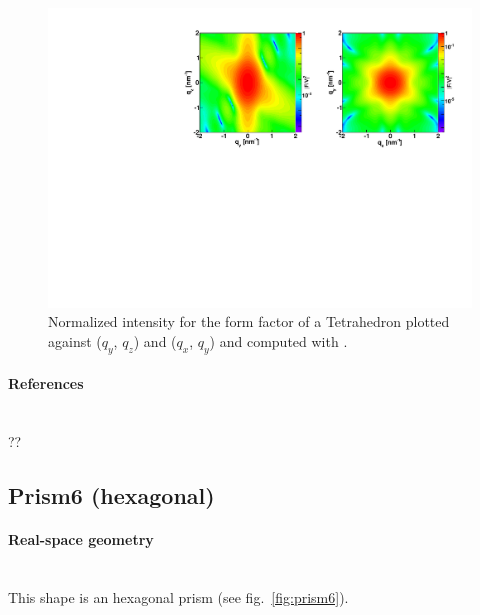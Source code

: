 \begin{figure}[ht]
\begin{center}
\includegraphics[angle=-90,width=\textwidth]{fig/ff/figfftetrahedron.pdf}
\end{center}
\caption{Normalized intensity for the form factor of a Tetrahedron
  plotted against ($q_y$, $q_z$) and  ($q_x$, $q_y$) and
  computed with .}
\label{fig:FFtetrahEx}
\end{figure}

\paragraph{References}\strut\\
??

\newpage
\subsection{Prism6 (hexagonal)} 

\paragraph{Real-space geometry}\strut\\
This shape is an hexagonal prism (see fig.~\ref{fig:prism6}).

